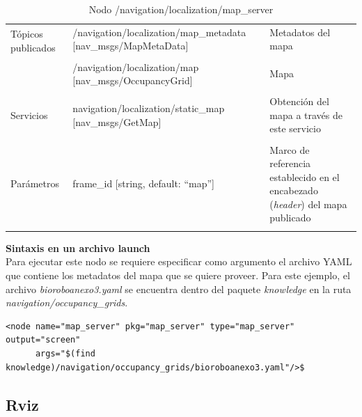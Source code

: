 \documentclass[user_manual.tex]{subfiles}
\begin{document}
\begin{table}[H]
\begin{center}
\begin{tabular}{|l|p{6cm}|p{5cm}|}%
\hline

\multirow{2}{*}{Tópicos publicados}
& /navigation/localization/map\_metadata [nav\_msgs/MapMetaData] & Metadatos del mapa \\
& & \\
& /navigation/localization/map [nav\_msgs/OccupancyGrid] & Mapa  \\
& & \\
\cline{1-3}
 
Servicios
& navigation/localization/static\_map [nav\_msgs/GetMap] & Obtención del mapa a través de este servicio \\
& & \\
\hline

Parámetros
& frame\_id [string, default: ``map''] & Marco de referencia establecido en el encabezado (\textit{header}) del mapa publicado \\
& & \\
\hline

\end{tabular}
\caption{Nodo /navigation/localization/map\_server}
\label{map server node}
\end{center}
\end{table}

\textbf{Sintaxis en un archivo launch}\\
Para ejecutar este nodo se requiere especificar como argumento el archivo YAML que contiene los metadatos del mapa que se quiere proveer. Para este ejemplo, el archivo \textit{bioroboanexo3.yaml} se encuentra dentro del paquete \textit{knowledge} en la ruta \textit{navigation/occupancy\_grids}.\\
\begin{verbatim}
<node name="map_server" pkg="map_server" type="map_server" output="screen" 
      args="$(find knowledge)/navigation/occupancy_grids/bioroboanexo3.yaml"/>$
\end{verbatim}

\subsection{Rviz}
\end{document}
